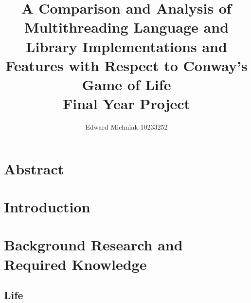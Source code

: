 \documentclass[11pt]{article} %
\title{A Comparison and Analysis of Multithreading Language and Library Implementations and Features with Respect to Conway's Game of Life\\Final Year Project}
\author{Edward Michniak 10233252}
\date{} %
\begin{document}
\maketitle
\tableofcontents
\pagebreak
\section{Abstract}
\section{Introduction}
\section{Background Research and Required Knowledge}
\subsection{Life}
\end{document}
